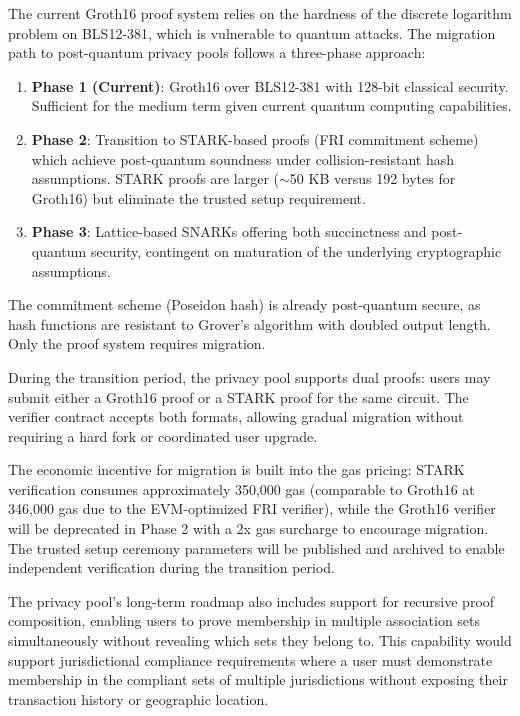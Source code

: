 The current Groth16 proof system relies on the hardness of the discrete logarithm problem on BLS12-381, which is vulnerable to quantum attacks. The migration path to post-quantum privacy pools follows a three-phase approach:

\begin{enumerate}
    \item \textbf{Phase 1 (Current)}: Groth16 over BLS12-381 with 128-bit classical security. Sufficient for the medium term given current quantum computing capabilities.
    \item \textbf{Phase 2}: Transition to STARK-based proofs (FRI commitment scheme) which achieve post-quantum soundness under collision-resistant hash assumptions. STARK proofs are larger ($\sim$50 KB versus 192 bytes for Groth16) but eliminate the trusted setup requirement.
    \item \textbf{Phase 3}: Lattice-based SNARKs offering both succinctness and post-quantum security, contingent on maturation of the underlying cryptographic assumptions.
\end{enumerate}

The commitment scheme (Poseidon hash) is already post-quantum secure, as hash functions are resistant to Grover's algorithm with doubled output length. Only the proof system requires migration.

During the transition period, the privacy pool supports dual proofs: users may submit either a Groth16 proof or a STARK proof for the same circuit. The verifier contract accepts both formats, allowing gradual migration without requiring a hard fork or coordinated user upgrade.

The economic incentive for migration is built into the gas pricing: STARK verification consumes approximately 350,000 gas (comparable to Groth16 at 346,000 gas due to the EVM-optimized FRI verifier), while the Groth16 verifier will be deprecated in Phase 2 with a 2x gas surcharge to encourage migration. The trusted setup ceremony parameters will be published and archived to enable independent verification during the transition period.

The privacy pool's long-term roadmap also includes support for recursive proof composition, enabling users to prove membership in multiple association sets simultaneously without revealing which sets they belong to. This capability would support jurisdictional compliance requirements where a user must demonstrate membership in the compliant sets of multiple jurisdictions without exposing their transaction history or geographic location.

